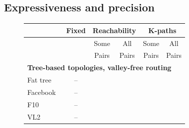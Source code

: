 \documentclass[numbers, 10pt]{sigplanconf}
\newcommand{\sysname}{{\text{}\small \sf Propane/AT}\xspace}
\newcommand{\cmark}{\ding{51}}
\begin{document}

\subsection{Expressiveness and precision}
\begin{figure}[t!]
  \begin{center}
\small
      \begin{tabular}{| l | c| c | c | c | c | }
      \hline
       & \textbf{Fixed} & \multicolumn{2}{|c|}{\textbf{Reachability}} & \multicolumn{2}{|c|}{\textbf{K-paths}} \\ \hline
       & & Some & All & Some & All \\
       & & Pairs & Pairs & Pairs & Pairs \\ \hline

      \multicolumn{6}{l}{\textbf{Tree-based topologies, valley-free routing}} \\ \hline

      Fat tree~\cite{fattree} & -- & \cmark & \cmark & \cmark & \cmark  \\ \hline
      Facebook~\cite{facebook-fattree} & -- & \cmark & \cmark & \cmark & \cmark \\ \hline
      F10~\cite{f10-fattree} & -- & \cmark & \cmark & \cmark & \cmark \\ \hline
      VL2~\cite{vl2-fattree} & -- & \cmark & \cmark & \cmark & \cmark \\ \hline
%


\end{tabular}
\end{center}
\end{figure}
\end{document}
